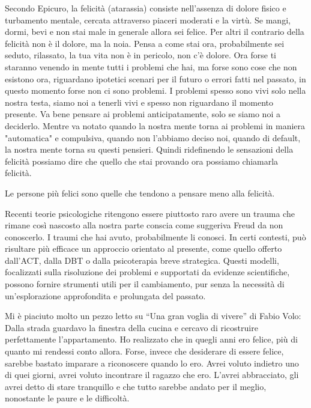 \documentclass[12pt]{book} %
\begin{document}
Secondo Epicuro, la felicità (atarassia) consiste nell’assenza di dolore fisico e turbamento mentale, cercata attraverso piaceri moderati e la virtù. Se mangi, dormi, bevi e non 
stai male in generale allora sei felice. Per altri il contrario della felicità non è il dolore, ma la noia. Pensa a
come stai ora, probabilmente sei seduto, rilassato, la tua vita non è in pericolo, non c'è dolore.
Ora forse ti staranno venendo in mente tutti i problemi che hai, ma forse sono cose che non esistono ora, riguardano ipotetici scenari per il futuro o errori fatti nel passato, in questo momento forse non ci sono
problemi. I problemi spesso sono vivi solo nella nostra testa, siamo noi a tenerli vivi e spesso non riguardano il
momento presente. Va bene pensare ai problemi anticipatamente, solo se siamo noi a deciderlo. Mentre va notato quando la nostra mente torna ai problemi in maniera "automatica" e compulsiva, quando non l'abbiamo deciso noi, quando di default, la nostra mente torna su questi pensieri.
Quindi ridefinendo le sensazioni della felicità possiamo dire che quello che stai provando ora possiamo chiamarla felicità. 

Le persone più felici sono quelle che tendono a pensare meno alla felicità.

Recenti teorie psicologiche ritengono essere piuttosto raro avere un trauma che rimane così nascosto alla nostra parte conscia come
suggeriva Freud da non conoscerlo. I traumi che hai avuto, probabilmente li conosci. In certi contesti, può risultare più efficace un approccio orientato al presente, come quello offerto dall'ACT, dalla DBT o dalla psicoterapia breve strategica. Questi modelli, focalizzati sulla risoluzione dei problemi e supportati da evidenze scientifiche, possono fornire strumenti utili per il cambiamento, pur senza la necessità di un'esplorazione approfondita e prolungata del passato.

Mi è piaciuto molto un pezzo letto su “Una gran voglia di vivere” di
Fabio Volo: Dalla strada guardavo la finestra della cucina e cercavo di ricostruire perfettamente
l'appartamento. Ho realizzato che in quegli anni ero felice, più di quanto mi rendessi conto
allora. Forse, invece che desiderare di essere felice, sarebbe bastato imparare a riconoscere quando lo ero. Avrei
voluto indietro uno di quei giorni, avrei voluto incontrare il ragazzo che ero. L'avrei
abbracciato, gli avrei detto di stare tranquillo e che tutto sarebbe andato per il meglio, nonostante le paure e le
difficoltà. 
\end{document}
